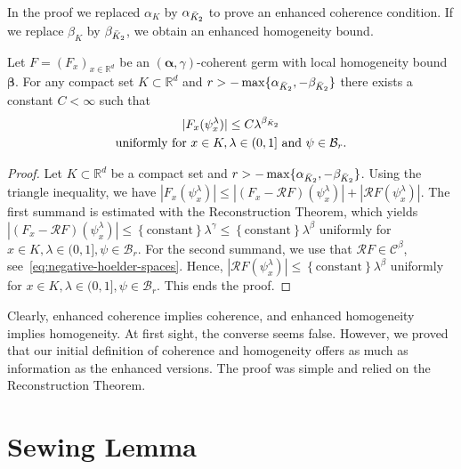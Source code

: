 In the proof we replaced \( \alpha_{K} \) by \( \alpha_{\bar{K}_{2}} \) to prove an enhanced coherence condition. If we replace \( \beta_{K} \) by \( \beta_{\bar{K}_{2}} \), we obtain an enhanced homogeneity bound.

\begin{theorem}
  Let \( F = (F_x)_{x \in \mathbb{R}^d} \) be an \( (\bm{\alpha}, \gamma) \)-coherent germ with local homogeneity bound \( \bm{\beta} \). For any compact set \( K \subset \mathbb{R}^d \) and \( r > - \max\{ \alpha_{\bar{K}_{2}}, - \beta_{\bar{K}_{2}} \} \) there exists a constant \( C < \infty \) such that
  \begin{gather*}
    |F_x(\psi^\lambda_x)| \leq C \lambda^{\beta_{\bar{K}_{2}}}
    \\
    \text{uniformly for \(x \in K, \lambda \in (0,1] \) and \( \psi \in \mathcal{B}_r \).}
  \end{gather*}
\end{theorem}

\begin{proof}
  Let \( K \subset \mathbb{R}^d \) be a compact set and \( r > - \max\{ \alpha_{\bar{K}_{2}}, - \beta_{\bar{K}_{2}} \} \). Using the triangle inequality, we have \( |F_x(\psi^\lambda_x)| \leq |(F_x -\mathcal{R}F)(\psi^\lambda_x)| + |\mathcal{R}F(\psi^\lambda_x)| \). The first summand is estimated with the Reconstruction Theorem, which yields  \( |(F_x -\mathcal{R}F)(\psi^\lambda_x)| \leq \left\{ \mathrm{constant} \right \} \lambda^\gamma \leq \left\{ \mathrm{constant} \right\} \lambda^\beta \) uniformly for \( x \in K, \lambda \in (0,1], \psi \in \mathcal{B}_r \). For the second summand, we use that \( \mathcal{R}F \in \mathcal{C}^\beta \), see~\eqref{eq:negative-hoelder-spaces}. Hence, \( |\mathcal{R}F(\psi^\lambda_x) | \leq \left\{ \mathrm{constant} \right\} \lambda^\beta \)  uniformly for \( x \in K, \lambda \in (0,1], \psi \in \mathcal{B}_r \). This ends the proof.
\end{proof}

Clearly, enhanced coherence implies coherence, and enhanced homogeneity implies homogeneity. At first sight, the converse seems false. However, we proved that our initial definition of coherence and homogeneity offers as much as information as the enhanced versions. The proof was simple and relied on the Reconstruction Theorem.

\section{Sewing Lemma}\label{section:sewing-lemma}

